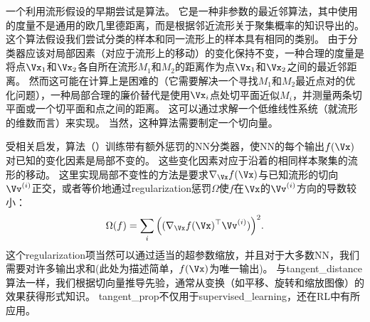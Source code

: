 一个利用流形假设的早期尝试是算法\citep{Simard-et-al-1993,Simard-et-al-1998}。
它是一种非参数的最近邻算法，其中使用的度量不是通用的欧几里德距离，而是根据邻近流形关于聚集概率的知识导出的。
这个算法假设我们尝试分类的样本和同一流形上的样本具有相同的类别。
由于分类器应该对局部因素（对应于流形上的移动）的变化保持不变，一种合理的度量是将点$\Vx_1$和$\Vx_2$各自所在流形$M_1$和$M_2$的距离作为点$\Vx_1$和$\Vx_2$之间的最近邻距离。
然而这可能在计算上是困难的（它需要解决一个寻找$M_1$和$M_2$最近点对的优化问题），一种局部合理的廉价替代是使用$\Vx_i$点处切平面近似$M_i$，并测量两条切平面或一个切平面和点之间的距离。
这可以通过求解一个低维线性系统（就流形的维数而言）来实现。
当然，这种算法需要制定一个切向量。

受相关启发，算法\citep{Simard-et-al-1992}（）训练带有额外惩罚的\gls{NN}分类器，使\gls{NN}的每个输出$f(\Vx)$对已知的变化因素是局部不变的。
这些变化因素对应于沿着的相同样本聚集的流形的移动。
这里实现局部不变性的方法是要求$\nabla_{\Vx} f(\Vx)$与已知流形的切向$\Vv^{(i)}$正交，或者等价地通过\gls{regularization}惩罚$\Omega$使$f$在$\Vx$的$\Vv^{(i)}$方向的导数较小：
\begin{align} \label{eq:767}
 \Omega(f) = \sum_i \Big((\nabla_{\Vx} f(\Vx)^\top \Vv^{(i)}) \Big)^2 .
\end{align}
这个\gls{regularization}项当然可以通过适当的超参数缩放，并且对于大多数\gls{NN}，我们需要对许多输出求和(此处为描述简单，$f(\Vx)$为唯一输出)。
与\gls{tangent_distance}算法一样，我们根据切向量推导先验，通常从变换（如平移、旋转和缩放图像）的效果获得形式知识。
\gls{tangent_prop}不仅用于\gls{supervised_learning}\citep{Simard-et-al-1992}，还在\gls{RL}\citep{Thrun-1995}中有所应用。
